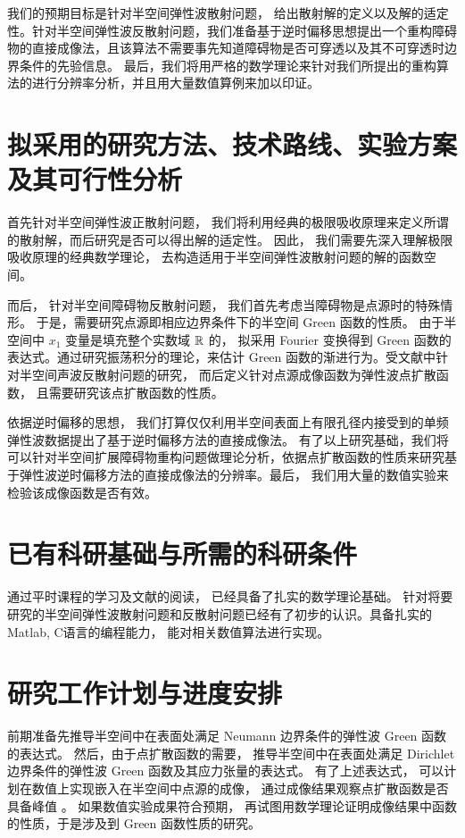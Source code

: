 我们的预期目标是针对半空间弹性波散射问题， 给出散射解的定义以及解的适定性。针对半空间弹性波反散射问题，我们准备基于逆时偏移思想提出一个重构障碍物的直接成像法，且该算法不需要事先知道障碍物是否可穿透以及其不可穿透时边界条件的先验信息。 最后，我们将用严格的数学理论来针对我们所提出的重构算法的进行分辨率分析，并且用大量数值算例来加以印证。

\section{拟采用的研究方法、技术路线、实验方案及其可行性分析}

首先针对半空间弹性波正散射问题， 我们将利用经典的极限吸收原理来定义所谓的散射解，而后研究是否可以得出解的适定性。 因此， 我们需要先深入理解极限吸收原理的经典数学理论， 去构造适用于半空间弹性波散射问题的解的函数空间。

而后， 针对半空间障碍物反散射问题， 我们首先考虑当障碍物是点源时的特殊情形。 于是，需要研究点源即相应边界条件下的半空间 Green 函数的性质。 由于半空间中 $x_1$ 变量是填充整个实数域 $\mathbb{R}$ 的， 拟采用 Fourier 变换得到 Green 函数的表达式。通过研究振荡积分的理论，来估计 Green 函数的渐进行为。受文献\cite{RTMhalf_aco}中针对半空间声波反散射问题的研究， 而后定义针对点源成像函数为弹性波点扩散函数， 且需要研究该点扩散函数的性质。

依据逆时偏移的思想， 我们打算仅仅利用半空间表面上有限孔径内接受到的单频弹性波数据提出了基于逆时偏移方法的直接成像法。 有了以上研究基础，我们将可以针对半空间扩展障碍物重构问题做理论分析，依据点扩散函数的性质来研究基于弹性波逆时偏移方法的直接成像法的分辨率。最后， 我们用大量的数值实验来检验该成像函数是否有效。
\section{已有科研基础与所需的科研条件}
通过平时课程的学习及文献的阅读， 已经具备了扎实的数学理论基础。 针对将要研究的半空间弹性波散射问题和反散射问题已经有了初步的认识。具备扎实的 Matlab, C语言的编程能力， 能对相关数值算法进行实现。


\section{研究工作计划与进度安排}

前期准备先推导半空间中在表面处满足 Neumann 边界条件的弹性波 Green 函数的表达式。 然后，由于点扩散函数的需要， 推导半空间中在表面处满足 Dirichlet 边界条件的弹性波 Green 函数及其应力张量的表达式。 有了上述表达式， 可以计划在数值上实现嵌入在半空间中点源的成像， 通过成像结果观察点扩散函数是否具备峰值 。 如果数值实验成果符合预期， 再试图用数学理论证明成像结果中函数的性质，于是涉及到 Green 函数性质的研究。

